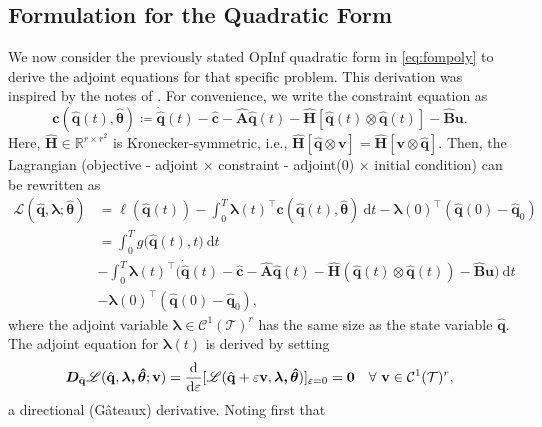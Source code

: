 \subsection*{Formulation for the Quadratic Form}

We now consider the previously stated OpInf quadratic form in \eqref{eq:fompoly} to derive the adjoint equations for that specific problem. This derivation was inspired by the notes of \cite{mcquarrie2024bayesian}. For convenience, we write the constraint equation as\\ 
$$\boldsymbol{c}(\hat{\mathbf{q}}(t),\hat{\bm{\theta}}) \coloneqq \dot{\hat{\mathbf{q}}}(t) - \hat{\mathbf{c}} - \hat{\mathbf{A}}\hat{\mathbf{q}}(t) - \hat{\mathbf{H}}[\hat{\mathbf{q}}(t)\otimes \hat{\mathbf{q}}(t)] - \hat{\mathbf{B}}\mathbf{u}.$$
Here, $\hat{\mathbf{H}}\in \mathbb{R}^{r\times r^2}$ is Kronecker-symmetric, i.e., $\hat{\mathbf{H}}[\hat{\mathbf{q}}\otimes \mathbf{v}] = \hat{\mathbf{H}}[\mathbf{v}\otimes \hat{\mathbf{q}}]$. Then, the Lagrangian (objective - adjoint $\times$ constraint - adjoint(0) $\times$ initial condition) can be rewritten as\\
\begin{align*}
    \mathscr{L}(\hat{\mathbf{q}}, \bm{\lambda}; \hat{\bm{\theta}}) &= \ell(\hat{\mathbf{q}}(t)) - \int_0^T \bm{\lambda}(t)^{\top}\boldsymbol{c}(\hat{\mathbf{q}}(t),\hat{\bm{\theta}})~\mathrm{d}t - \bm{\lambda}(0)^{\top}(\hat{\mathbf{q}}(0)-\hat{\mathbf{q}}_0)\\
    &= \int_0^T g\bigl(\hat{\mathbf{q}}(t),t \bigl)~\mathrm{d}t \\
    &- \int_0^T \bm{\lambda}(t)^{\top}\bigl(\dot{\hat{\mathbf{q}}}(t) - \hat{\mathbf{c}} - \hat{\mathbf{A}}\hat{\mathbf{q}}(t) - \hat{\mathbf{H}}(\hat{\mathbf{q}}(t)\otimes \hat{\mathbf{q}}(t)) - \hat{\mathbf{B}}\mathbf{u}\bigr)~\mathrm{d}t \\
    &-\bm{\lambda}(0)^{\top}(\hat{\mathbf{q}}(0)-\hat{\mathbf{q}}_0),
\end{align*}
where the adjoint variable $\bm{\lambda}\in\mathcal{C}^1(\mathcal{T})^r$ has the same size as the state variable $\hat{\mathbf{q}}$. The adjoint equation for $\bm{\lambda}(t)$ is derived by setting\\
$$ \bm{D}_{\hat{\mathbf{q}}} \mathscr{L}(\hat{\mathbf{q}},\bm{\lambda,\hat{\bm{\theta}}};\mathbf{v}) = \dv{}{\varepsilon}[\mathscr{L}(\hat{\mathbf{q}}+\varepsilon \mathbf{v},\bm{\lambda,\hat{\bm{\theta}}})]_{\varepsilon=0} = \bm{0}~~~\forall~\mathbf{v}\in\mathcal{C}^1(\mathcal{T})^r,$$a directional (Gâteaux) derivative. Noting first that\\

